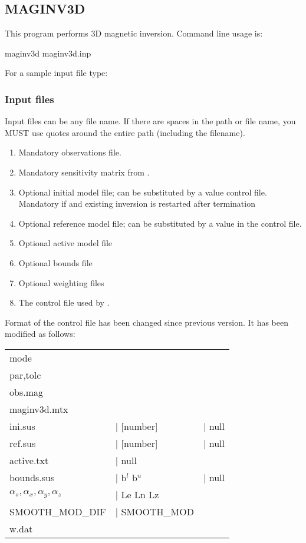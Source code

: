 \subsection{MAGINV3D}
This program performs 3D magnetic inversion. Command line usage is:
\begin{fileExample}
maginv3d maginv3d.inp
\end{fileExample}

For a sample input file type: 

\subsubsection{Input files}
Input files can be any file name. If there are spaces in the path or file name, you MUST use quotes around the entire path (including the filename).

\begin{enumerate}
\item {} Mandatory observations file.
\item {} Mandatory sensitivity matrix from .
\item {} Optional initial model file; can be substituted by a value  control file. Mandatory if and existing inversion is restarted after termination
\item {} Optional reference model file; can be substituted by a value in the  control file.
\item {} Optional active model file
\item {} Optional bounds file
\item {} Optional weighting files
\item {} The control file used by .
\end{enumerate}

Format of the control file  has been changed since previous version. It has been modified as follows:

\begin{fileExample}
\begin{tabular}{|lll|}
\hline
mode & & \\
par,tolc & & \\
obs.mag & & \\
maginv3d.mtx & & \\
ini.sus & | [number] &| null \\
ref.sus & | [number] &| null \\
active.txt & | null & \\
bounds.sus & | b$^l$ b$^u$ &| null \\
$\alpha_s, \alpha_x, \alpha_y, \alpha_z$ &| Le Ln Lz &\\
SMOOTH\_MOD\_DIF &| SMOOTH\_MOD &\\
w.dat & & \\
\hline
\end{tabular}
\end{fileExample}

